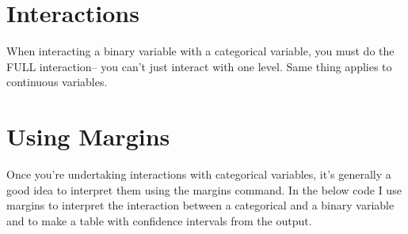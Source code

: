 \documentclass[12 pt]{article}
\begin{document}
\section{Interactions}

When interacting a binary variable with a categorical variable, you
must do the FULL interaction-- you can't just interact with one
level. Same thing applies to continuous variables. 


\section{Using Margins}

Once you're undertaking interactions with categorical variables, it's
generally a good idea to interpret them using the margins command. In
the below code I use margins to interpret the interaction between a
categorical and a binary variable and to make a table with confidence
intervals from the output. 
\end{document}
